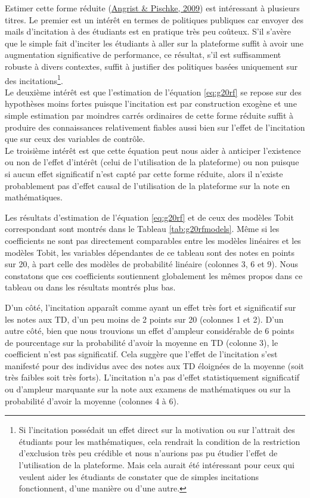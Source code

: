\documentclass[
]{book}
\begin{document}
\quad Estimer cette forme réduite (\protect\hyperlink{ref-ANG:PIS:08}{Angrist \& Pischke, 2009}) est intéressant à plusieurs titres. Le premier est un intérêt en termes de politiques publiques car envoyer des mails d'incitation à des étudiants est en pratique très peu coûteux. S'il s'avère que le simple fait d'inciter les étudiants à aller sur la plateforme suffit à avoir une augmentation significative de performance, ce résultat, s'il est suffisamment robuste à divers contextes, suffit à justifier des politiques basées uniquement sur des incitations\footnote{Si l'incitation possédait un effet direct sur la motivation ou sur l'attrait des étudiants pour les mathématiques, cela rendrait la condition de la restriction d'exclusion très peu crédible et nous n'aurions pas pu étudier l'effet de l'utilisation de la plateforme. Mais cela aurait été intéressant pour ceux qui veulent aider les étudiants de constater que de simples incitations fonctionnent, d'une manière ou d'une autre.}.\\
Le deuxième intérêt est que l'estimation de l'équation \eqref{eq:g20rf} se repose sur des hypothèses moins fortes puisque l'incitation est par construction exogène et une simple estimation par moindres carrés ordinaires de cette forme réduite suffit à produire des connaissances relativement fiables aussi bien sur l'effet de l'incitation que sur ceux des variables de contrôle.\\
Le troisième intérêt est que cette équation peut nous aider à anticiper l'existence ou non de l'effet d'intérêt (celui de l'utilisation de la plateforme) ou non puisque si aucun effet significatif n'est capté par cette forme réduite, alors il n'existe probablement pas d'effet causal de l'utilisation de la plateforme sur la note en mathématiques.

\quad Les résultats d'estimation de l'équation \eqref{eq:g20rf} et de ceux des modèles Tobit correspondant sont montrés dans le Tableau \ref{tab:g20rfmodels}. Même si les coefficients ne sont pas directement comparables entre les modèles linéaires et les modèles Tobit, les variables dépendantes de ce tableau sont des notes en points sur 20, à part celle des modèles de probabilité linéaire (colonnes 3, 6 et 9). Nous constatons que ces coefficients soutiennent globalement les mêmes propos dans ce tableau ou dans les résultats montrés plus bas.

D'un côté, l'incitation apparaît comme ayant un effet très fort et significatif sur les notes aux TD, d'un peu moins de 2 points sur 20 (colonnes 1 et 2). D'un autre côté, bien que nous trouvions un effet d'ampleur considérable de 6 points de pourcentage sur la probabilité d'avoir la moyenne en TD (colonne 3), le coefficient n'est pas significatif. Cela suggère que l'effet de l'incitation s'est manifesté pour des individus avec des notes aux TD éloignées de la moyenne (soit très faibles soit très forts). L'incitation n'a pas d'effet statistiquement significatif ou d'ampleur marquante sur la note aux examens de mathématiques ou sur la probabilité d'avoir la moyenne (colonnes 4 à 6).
\end{document}
